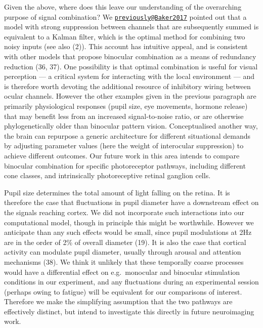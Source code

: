 \documentclass[
]{article}
\begin{document}
Given the above, where does this leave our understanding of the overarching purpose of signal combination? We \href{mailto:previously@Baker2017}{\nolinkurl{previously@Baker2017}} pointed out that a model with strong suppression between channels that are subsequently summed is equivalent to a Kalman filter, which is the optimal method for combining two noisy inputs (see also (2)). This account has intuitive appeal, and is consistent with other models that propose binocular combination as a means of redundancy reduction (36, 37). One possibility is that optimal combination is useful for visual perception --- a critical system for interacting with the local environment --- and is therefore worth devoting the additional resource of inhibitory wiring between ocular channels. However the other examples given in the previous paragraph are primarily physiological responses (pupil size, eye movements, hormone release) that may benefit less from an increased signal-to-noise ratio, or are otherwise phylogenetically older than binocular pattern vision. Conceptualised another way, the brain can repurpose a generic architecture for different situational demands by adjusting parameter values (here the weight of interocular suppression) to achieve different outcomes. Our future work in this area intends to compare binocular combination for specific photoreceptor pathways, including different cone classes, and intrinsically photoreceptive retinal ganglion cells.

Pupil size determines the total amount of light falling on the retina. It is therefore the case that fluctuations in pupil diameter have a downstream effect on the signals reaching cortex. We did not incorporate such interactions into our computational model, though in principle this might be worthwhile. However we anticipate than any such effects would be small, since pupil modulations at 2Hz are in the order of 2\% of overall diameter (19). It is also the case that cortical activity can modulate pupil diameter, usually through arousal and attention mechanisms (38). We think it unlikely that these temporally coarse processes would have a differential effect on e.g.~monocular and binocular stimulation conditions in our experiment, and any fluctuations during an experimental session (perhaps owing to fatigue) will be equivalent for our comparisons of interest. Therefore we make the simplifying assumption that the two pathways are effectively distinct, but intend to investigate this directly in future neuroimaging work.
\end{document}
